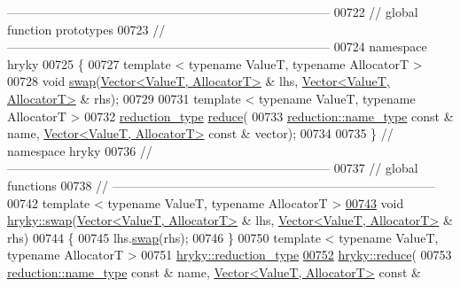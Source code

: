 \begin{DoxyCode}
{      ------------------------------------------------------------------------------}
00722 \textcolor{comment}{// global function prototypes}
00723 \textcolor{comment}{//
      ------------------------------------------------------------------------------}
00724 \textcolor{keyword}{namespace }hryky
00725 \{
00727     \textcolor{keyword}{template} < \textcolor{keyword}{typename} ValueT, \textcolor{keyword}{typename} AllocatorT >
00728     \textcolor{keywordtype}{void} \hyperlink{namespacehryky_a4282146df5ea2b68cb667896a2205909}{swap}(\hyperlink{classhryky_1_1_vector}{Vector<ValueT, AllocatorT>} & lhs, \hyperlink{classhryky_1_1_vector}{Vector<ValueT, AllocatorT>} & 
      rhs);
00729 
00731     \textcolor{keyword}{template} < \textcolor{keyword}{typename} ValueT, \textcolor{keyword}{typename} AllocatorT >
00732     \hyperlink{classhryky_1_1_intrusive_ptr}{reduction_type} \hyperlink{namespacehryky_af41cb3af6766761da0ff21b84527a52c}{reduce}(
00733         \hyperlink{classhryky_1_1reduction_1_1_string}{reduction::name_type} \textcolor{keyword}{const} & name, \hyperlink{classhryky_1_1_vector}{Vector<ValueT, AllocatorT>} \textcolor{keyword}{const} & 
      vector);
00734 
00735 \} \textcolor{comment}{// namespace hryky}
00736 \textcolor{comment}{//
      ------------------------------------------------------------------------------}
00737 \textcolor{comment}{// global functions}
00738 \textcolor{comment}{//
      ------------------------------------------------------------------------------}
00742 \textcolor{comment}{}\textcolor{keyword}{template} < \textcolor{keyword}{typename} ValueT, \textcolor{keyword}{typename} AllocatorT >
\hypertarget{vector_8h_source_l00743}{}\hyperlink{namespacehryky_af6bd1b171f155980bc887656187ae51d}{00743} \textcolor{keywordtype}{void} \hyperlink{namespacehryky_a4282146df5ea2b68cb667896a2205909}{hryky::swap}(\hyperlink{classhryky_1_1_vector}{Vector<ValueT, AllocatorT>} & lhs, \hyperlink{classhryky_1_1_vector}{Vector<ValueT, AllocatorT>} &
       rhs)
00744 \{
00745     lhs.\hyperlink{classhryky_1_1_vector_abcf365626457abf95d05b0a736e7a60a}{swap}(rhs);
00746 \}
00750 \textcolor{keyword}{template} < \textcolor{keyword}{typename} ValueT, \textcolor{keyword}{typename} AllocatorT >
00751 \hyperlink{classhryky_1_1_intrusive_ptr}{hryky::reduction_type}
\hypertarget{vector_8h_source_l00752}{}\hyperlink{namespacehryky_a831f782cbe9d9e4dc64e4e185cf82e00}{00752} \hyperlink{namespacehryky_af41cb3af6766761da0ff21b84527a52c}{hryky::reduce}(
00753     \hyperlink{classhryky_1_1reduction_1_1_string}{reduction::name_type} \textcolor{keyword}{const} & name, \hyperlink{classhryky_1_1_vector}{Vector<ValueT, AllocatorT>} \textcolor{keyword}{const} & 

\end{DoxyCode}
